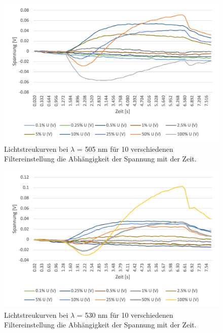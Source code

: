 \documentclass[10pt,a4paper]{article}
\begin{document}
	\begin{figure}[H]
	\centering
	\includegraphics[scale=1]{Picture 3.png}
	\caption{Lichtstreukurven bei $\lambda$ = 505 nm für 10 verschiedenen Filtereinstellung die Abhängigkeit der Spannung mit der Zeit. }
	\label{fig:505nm}
	\end{figure}

	\begin{figure}[H]
	\centering
	\includegraphics[scale=1]{Picture 4.png}
	\caption{Lichtstreukurven bei $\lambda$ = 530 nm für 10 verschiedenen Filtereinstellung die Abhängigkeit der Spannung mit der Zeit. }
	\label{fig:530nm}
	\end{figure}
	
\end{document}
